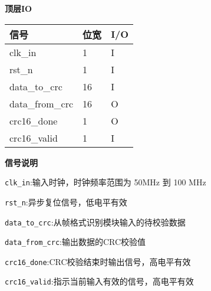 \documentclass[12pt,]{article}
\begin{document}
\textbf{顶层IO}

\begin{longtable}[]{@{}lll@{}}
\toprule\noalign{}
信号 & 位宽 & I/O \\
\midrule\noalign{}
\endhead
\bottomrule\noalign{}
\endlastfoot
clk\_in & 1 & I \\
rst\_n & 1 & I \\
data\_to\_crc & 16 & I \\
data\_from\_crc & 16 & O \\
crc16\_done & 1 & O \\
crc16\_valid & 1 & I \\
\end{longtable}

\textbf{信号说明}

\texttt{clk\_in}:输入时钟，时钟频率范围为 50MHz 到 100 MHz

\texttt{rst\_n}:异步复位信号，低电平有效

\texttt{data\_to\_crc}:从帧格式识别模块输入的待校验数据

\texttt{data\_from\_crc}:输出数据的CRC校验值

\texttt{crc16\_done}:CRC校验结束时输出信号，高电平有效

\texttt{crc16\_valid}:指示当前输入有效的信号，高电平有效
\end{document}
